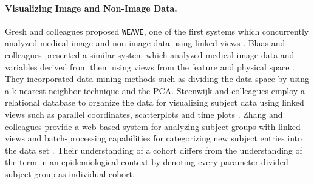 \documentclass[journal]{style/vgtc} 			          %
\begin{document}
\paragraph{Visualizing Image and Non-Image Data. }
Gresh and colleagues proposed \texttt{WEAVE}, one of the first systems which concurrently analyzed medical image and non-image data using linked views \cite{Gresh2000}.
%
Blaas and colleagues presented a similar system which analyzed medical image data and variables derived from them using views from the feature and physical space \cite{Blaas2007}.
%
They incorporated data mining methods such as dividing the data space by using a k-nearest neighbor technique and the PCA.
%
Steenwijk and colleagues employ a relational database to organize the data for visualizing subject data using linked views such as parallel coordinates, scatterplots and time plots \cite{Steenwijk2010}.
%
Zhang and colleagues provide a web-based system for analyzing subject groups with linked views and batch-processing capabilities for categorizing new subject entries into the data set \cite{Zhang2012}.
%
Their understanding of a cohort differs from the understanding of the term in an epidemiological context by denoting every parameter-divided subject group as individual cohort.
\end{document}
